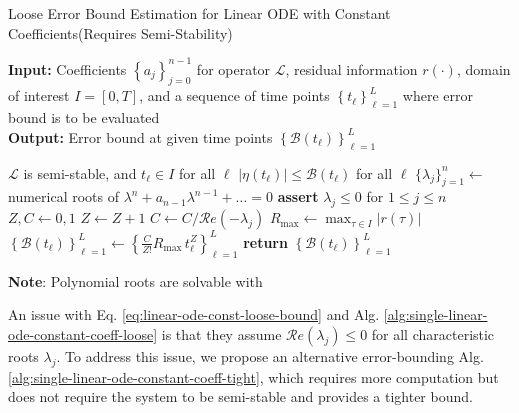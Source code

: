 \documentclass{uai2023}
\newcommand{\Err}{\eta}
\newcommand{\Bound}{\mathcal{B}}
\renewcommand{\L}{\mathcal{L}}
\renewcommand{\Re}[1]{\mathcal{R}e\left(#1\right)}
\begin{document}
    \begin{algorithm}
        \small
        \caption{Loose Error Bound Estimation for Linear ODE with Constant Coefficients\quad (Requires Semi-Stability)}\label{alg:single-linear-ode-constant-coeff-loose}
        \textbf{Input:} Coefficients $\left\{a_j\right\}_{j=0}^{n-1}$ for operator $\L$, residual information $r(\cdot)$, domain of interest $I = [0, T]$, and a sequence of time points $\left\{t_\ell\right\}_{\ell=1}^{L}$ where error bound is to be evaluated\\
        \textbf{Output:} Error bound at given time points $\left\{\Bound(t_\ell)\right\}_{\ell=1}^{L}$
        \begin{algorithmic}
            \Require $\L$ is semi-stable, and $t_\ell \in I$ for all $\ell$
            \Ensure $\left|\Err(t_\ell)\right| \leq \Bound(t_\ell)$ for all $\ell$
            \State $\{\lambda_j\}_{j=1}^{n} \gets$ numerical roots of $\lambda^n+a_{n-1}\lambda^{n-1}+\dots=0$ 
            \State \textbf{assert} $\lambda_j \leq 0$ for $1 \leq j \leq n$ 
            \State $Z, C \gets 0, 1$
                \If{$\Re{\lambda_j} = 0$}
                    \State $Z \gets Z + 1$
                \Else
                    \State $C \gets C / \Re{-\lambda_j}$
                \EndIf
            \EndFor
            \State $R_{\max} \gets \max_{\tau \in I} |r(\tau)|$ 
            \State $\left\{\Bound(t_\ell)\right\}_{\ell=1}^{L} \gets \left\{\frac{C}{Z!}R_{\max}\, t_\ell^{Z}\right\}_{\ell=1}^{L}$
            \State \textbf{return} $\left\{\Bound(t_\ell)\right\}_{\ell=1}^{L}$
        \end{algorithmic}
        \vspace{0.5em} 
        \textbf{Note}: Polynomial roots are solvable with \cite{jenkins1970three}
    \end{algorithm}

    An issue with Eq. \ref{eq:linear-ode-const-loose-bound} and Alg. \ref{alg:single-linear-ode-constant-coeff-loose} is that they assume $\Re{\lambda_j} \leq 0$ for all characteristic roots $\lambda_j$. 
    To address this issue, we propose an alternative error-bounding Alg. \ref{alg:single-linear-ode-constant-coeff-tight}, which requires more computation but does not require the system to be semi-stable and provides a tighter bound.
\end{document}
